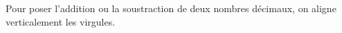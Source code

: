 Pour poser l'addition ou la soustraction de deux nombres décimaux, on aligne
verticalement les virgules.
